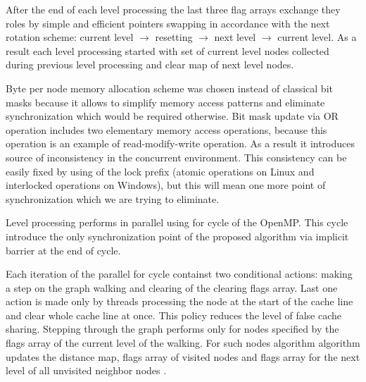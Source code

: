 \documentclass[letterpaper]{article}
\begin{document}
			After the end of each level processing the last three flag arrays exchange they roles by simple and efficient pointers swapping in accordance with the next rotation scheme: current level $\to$ resetting $\to$ next level $\to$ current level.
			As a result each level processing started with set of current level nodes collected during previous level processing and clear map of next level nodes. 

			Byte per node memory allocation scheme was chosen instead of classical bit masks because it allows to simplify memory access patterns and eliminate synchronization which would be required otherwise.
			Bit mask update via OR operation includes two elementary memory access operations, because this operation is an example of read-modify-write operation.
			As a result it introduces source of inconsistency in the concurrent environment.
			This consistency can be easily fixed by using of the lock prefix (atomic operations on Linux and interlocked operations on Windows), but this will mean one more point of synchronization which we are trying to eliminate.
			
			Level processing performs in parallel using for cycle of the OpenMP.
			This cycle introduce the only synchronization point of the proposed algorithm via implicit barrier at the end of cycle.
			
			Each iteration of the parallel for cycle containst two conditional actions: making a step on the graph walking and clearing of the clearing flags array.
			Last one action is made only by threads processing the node at the start of the cache line and clear whole cache line at once.
			This policy reduces the level of false cache sharing. 
			Stepping through the graph performs only for nodes specified by the flags array of the current level of the walking.
			For such nodes algorithm algorithm updates the distance map, flags array of visited nodes and flags array for the next level of all unvisited neighbor nodes .
						
\end{document}
